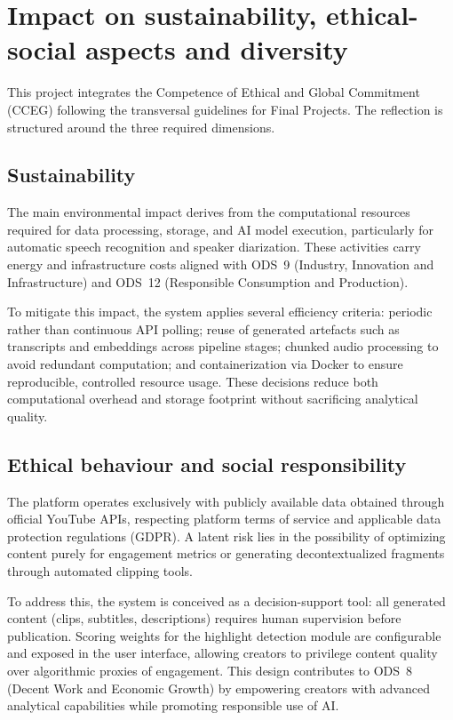 \documentclass[ENG]{TFUOC}
\begin{document}
\section{Impact on sustainability, ethical-social aspects and diversity}
\label{s:etic}

This project integrates the Competence of Ethical and Global Commitment (CCEG) following the transversal guidelines for Final Projects. The reflection is structured around the three required dimensions.

\subsection*{Sustainability}

The main environmental impact derives from the computational resources required for data processing, storage, and AI model execution, particularly for automatic speech recognition and speaker diarization. These activities carry energy and infrastructure costs aligned with ODS~9 (Industry, Innovation and Infrastructure) and ODS~12 (Responsible Consumption and Production).

To mitigate this impact, the system applies several efficiency criteria: periodic rather than continuous API polling; reuse of generated artefacts such as transcripts and embeddings across pipeline stages; chunked audio processing to avoid redundant computation; and containerization via Docker to ensure reproducible, controlled resource usage. These decisions reduce both computational overhead and storage footprint without sacrificing analytical quality.

\subsection*{Ethical behaviour and social responsibility}

The platform operates exclusively with publicly available data obtained through official YouTube APIs, respecting platform terms of service and applicable data protection regulations (GDPR). A latent risk lies in the possibility of optimizing content purely for engagement metrics or generating decontextualized fragments through automated clipping tools.

To address this, the system is conceived as a decision-support tool: all generated content (clips, subtitles, descriptions) requires human supervision before publication. Scoring weights for the highlight detection module are configurable and exposed in the user interface, allowing creators to privilege content quality over algorithmic proxies of engagement. This design contributes to ODS~8 (Decent Work and Economic Growth) by empowering creators with advanced analytical capabilities while promoting responsible use of AI.
\end{document}
